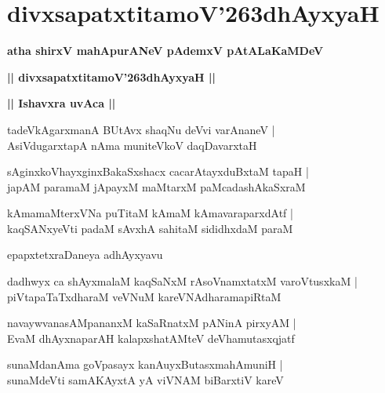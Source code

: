 \documentclass[twoside,12pt,openright]{book}
\def\S{\char'263}
\newcounter{shloka}[chapter]
\def\uvaca#1{\centerline{{\large\textbf{#1}}}}
\begin{document}
\chapter{divxsapatxtitamoV\S dhAyxyaH}

\begin{center}
{\LARGE\bfseries atha shirxV mahApurANeV pAdemxV pAtALaKaMDeV }
\end{center}

\begin{center}         
{\LARGE\bfseries || divxsapatxtitamoV\S dhAyxyaH ||}
\end{center}

\uvaca{|| Ishavxra uvAca ||}

\begin{shloka}%
tadeVkAgarxmanA BUtAvx shaqNu deVvi varAnaneV |\\
AsiVdugarxtapA nAma muniteVkoV daqDavarxtaH 
\end{shloka}

\begin{shloka}%
sAginxkoVhayxginxBakaSxshacx cacarAtayxduBxtaM tapaH |\\
japAM paramaM jApayxM maMtarxM paMcadashAkaSxraM 
\end{shloka}

\begin{shloka}%
kAmamaMterxVNa puTitaM kAmaM kAmavaraparxdAtf |\\
kaqSANxyeVti padaM sAvxhA sahitaM sididhxdaM paraM
\end{shloka}

\begin{center}
epapxtetxraDaneya adhAyxyavu
\end{center}

\begin{shloka}%
dadhwyx ca shAyxmalaM kaqSaNxM rAsoVnamxtatxM varoVtusxkaM |\\
piVtapaTaTxdharaM veVNuM kareVNAdharamapiRtaM 
\end{shloka}

\begin{shloka}%
navaywvanasAMpananxM kaSaRnatxM pANinA pirxyAM |\\
EvaM dhAyxnaparAH kalapxshatAMteV deVhamutasxqjatf 
\end{shloka}

\begin{shloka}%
sunaMdanAma goVpasayx kanAuyxButasxmahAmuniH |\\
sunaMdeVti samAKAyxtA yA viVNAM biBarxtiV kareV 
\end{shloka}
\end{document}
